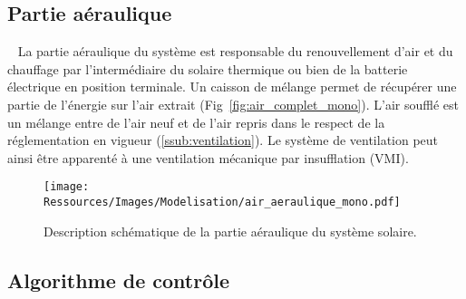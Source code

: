 \subsection{Partie aéraulique} %
\label{sub:partie_aeraulique}
~
La partie aéraulique du système est responsable du renouvellement d’air et du chauffage
par l’intermédiaire du solaire thermique ou bien de la batterie électrique en
position terminale. Un caisson de mélange permet de récupérer une partie de l’énergie
sur l’air extrait (Fig~\ref{fig:air_complet_mono}). L’air soufflé est un mélange entre de l’air neuf et de l’air repris
dans le respect de la réglementation en vigueur (\ref{ssub:ventilation}).
Le système de ventilation peut ainsi être apparenté à une ventilation mécanique par insufflation
(VMI).

\begin{figure}
    \begin{center}
        \texttt{[image: Ressources/Images/Modelisation/air\_aeraulique\_mono.pdf]}
    \end{center}
    \caption{Description schématique de la partie aéraulique du système solaire.
             \label{fig:schema_aeraulique}}
\end{figure}


\subsection{Algorithme de contrôle} %
\label{sub:algorithme_de_controle}
~

